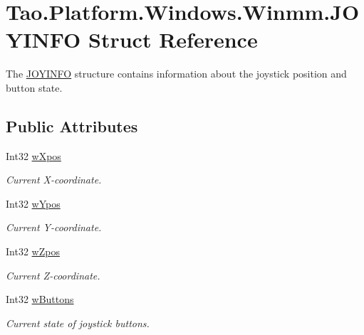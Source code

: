 \hypertarget{struct_tao_1_1_platform_1_1_windows_1_1_winmm_1_1_j_o_y_i_n_f_o}{
\section{Tao.Platform.Windows.Winmm.JOYINFO Struct Reference}
\label{struct_tao_1_1_platform_1_1_windows_1_1_winmm_1_1_j_o_y_i_n_f_o}
}


The \hyperlink{struct_tao_1_1_platform_1_1_windows_1_1_winmm_1_1_j_o_y_i_n_f_o}{JOYINFO} structure contains information about the joystick position and button state.  


\subsection*{Public Attributes}
\begin{DoxyCompactItemize}
\item 
Int32 \hyperlink{struct_tao_1_1_platform_1_1_windows_1_1_winmm_1_1_j_o_y_i_n_f_o_a0c3a02bf0d0620943d610f903346c4b5}{wXpos}
\begin{DoxyCompactList}\small\item\em Current X-\/coordinate. \item\end{DoxyCompactList}\item 
Int32 \hyperlink{struct_tao_1_1_platform_1_1_windows_1_1_winmm_1_1_j_o_y_i_n_f_o_aa8329072e16c2093f1c81a6ddb294c53}{wYpos}
\begin{DoxyCompactList}\small\item\em Current Y-\/coordinate. \item\end{DoxyCompactList}\item 
Int32 \hyperlink{struct_tao_1_1_platform_1_1_windows_1_1_winmm_1_1_j_o_y_i_n_f_o_aacfa79c6c641b06b806113ba42b54b11}{wZpos}
\begin{DoxyCompactList}\small\item\em Current Z-\/coordinate. \item\end{DoxyCompactList}\item 
Int32 \hyperlink{struct_tao_1_1_platform_1_1_windows_1_1_winmm_1_1_j_o_y_i_n_f_o_a4379fd286bf997c696c8d0d38d689996}{wButtons}
\begin{DoxyCompactList}\small\item\em Current state of joystick buttons. \item\end{DoxyCompactList}\end{DoxyCompactItemize}


